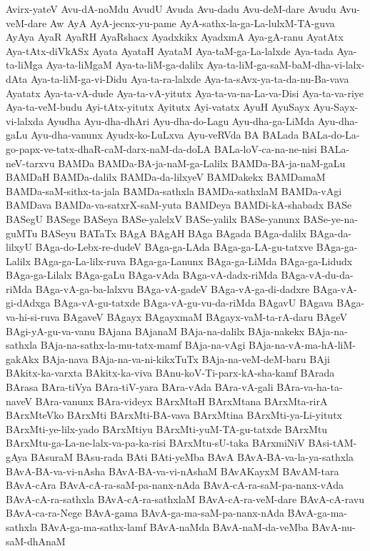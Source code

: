 {Avirx-yateV
Avu-dA-noMdu
AvudU
Avuda
Avu-dadu
Avu-deM-dare
Avudu
Avu-veM-dare
Aw
AyA
AyA-jecnx-yu-pame
AyA-sathx-la-ga-La-lulxM-TA-guva
AyAya
AyaR
AyaRH
AyaRshacx
Ayadxkikx
AyadxmA
Aya-gA-ranu
AyatAtx
Aya-tAtx-diVkASx
Ayata
AyataH
AyataM
Aya-taM-ga-La-lalxde
Aya-tada
Aya-ta-liMga
Aya-ta-liMgaM
Aya-ta-liM-ga-dalilx
Aya-ta-liM-ga-saM-baM-dha-vi-lalx-dAta
Aya-ta-liM-ga-vi-Didu
Aya-ta-ra-lalxde
Aya-ta-sAvx-ya-ta-da-nu-Ba-vava
Ayatatx
Aya-ta-vA-dude
Aya-ta-vA-yitutx
Aya-ta-va-na-La-va-Disi
Aya-ta-va-riye
Aya-ta-veM-budu
Ayi-tAtx-yitutx
Ayitutx
Ayi-vatatx
AyuH
AyuSayx
Ayu-Sayx-vi-lalxda
Ayudha
Ayu-dha-dhAri
Ayu-dha-do-Lagu
Ayu-dha-ga-LiMda
Ayu-dha-gaLu
Ayu-dha-vanunx
Ayudx-ko-LuLxva
Ayu-veRVda
BA
BALada
BALa-do-La-go-papx-ve-tatx-dhaR-caM-darx-naM-da-doLA
BALa-loV-ca-na-ne-nisi
BALa-neV-tarxvu
BAMDa
BAMDa-BA-ja-naM-ga-Lalilx
BAMDa-BA-ja-naM-gaLu
BAMDaH
BAMDa-dalilx
BAMDa-da-lilxyeV
BAMDakekx
BAMDamaM
BAMDa-saM-sithx-ta-jala
BAMDa-sathxla
BAMDa-sathxlaM
BAMDa-vAgi
BAMDava
BAMDa-va-satxrX-saM-yuta
BAMDeya
BAMDi-kA-shabadx
BASe
BASegU
BASege
BASeya
BASe-yalelxV
BASe-yalilx
BASe-yanunx
BASe-ye-na-guMTu
BASeyu
BATaTx
BAgA
BAgAH
BAga
BAgada
BAga-dalilx
BAga-da-lilxyU
BAga-do-Lebx-re-dudeV
BAga-ga-LAda
BAga-ga-LA-gu-tatxve
BAga-ga-Lalilx
BAga-ga-La-lilx-ruva
BAga-ga-Lanunx
BAga-ga-LiMda
BAga-ga-Lidudx
BAga-ga-Lilalx
BAga-gaLu
BAga-vAda
BAga-vA-dadx-riMda
BAga-vA-du-da-riMda
BAga-vA-ga-ba-lalxvu
BAga-vA-gadeV
BAga-vA-ga-di-dadxre
BAga-vA-gi-dAdxga
BAga-vA-gu-tatxde
BAga-vA-gu-vu-da-riMda
BAgavU
BAgava
BAga-va-hi-si-ruva
BAgaveV
BAgayx
BAgayxmaM
BAgayx-vaM-ta-rA-daru
BAgeV
BAgi-yA-gu-va-vanu
BAjana
BAjanaM
BAja-na-dalilx
BAja-nakekx
BAja-na-sathxla
BAja-na-sathx-la-mu-tatx-mamf
BAja-na-vAgi
BAja-na-vA-ma-hA-liM-gakAkx
BAja-nava
BAja-na-va-ni-kikxTuTx
BAja-na-veM-deM-baru
BAji
BAkitx-ka-varxta
BAkitx-ka-viva
BAnu-koV-Ti-parx-kA-sha-kamf
BArada
BArasa
BAra-tiVya
BAra-tiV-yara
BAra-vAda
BAra-vA-gali
BAra-va-ha-ta-naveV
BAra-vanunx
BAra-videyx
BArxMtaH
BArxMtana
BArxMta-rirA
BArxMteVko
BArxMti
BArxMti-BA-vava
BArxMtina
BArxMti-ya-Li-yitutx
BArxMti-ye-lilx-yado
BArxMtiyu
BArxMti-yuM-TA-gu-tatxde
BArxMtu
BArxMtu-ga-La-ne-lalx-va-pa-ka-risi
BArxMtu-sU-taka
BArxmiNiV
BAsi-tAM-gAya
BAsuraM
BAsu-rada
BAti
BAti-yeMba
BAvA
BAvA-BA-va-la-ya-sathxla
BAvA-BA-va-vi-nAsha
BAvA-BA-va-vi-nAshaM
BAvAKayxM
BAvAM-tara
BAvA-cAra
BAvA-cA-ra-saM-pa-nanx-nAda
BAvA-cA-ra-saM-pa-nanx-vAda
BAvA-cA-ra-sathxla
BAvA-cA-ra-sathxlaM
BAvA-cA-ra-veM-dare
BAvA-cA-ravu
BAvA-ca-ra-Nege
BAvA-gama
BAvA-ga-ma-saM-pa-nanx-nAda
BAvA-ga-ma-sathxla
BAvA-ga-ma-sathx-lamf
BAvA-naMda
BAvA-naM-da-veMba
BAvA-nu-saM-dhAnaM
}
